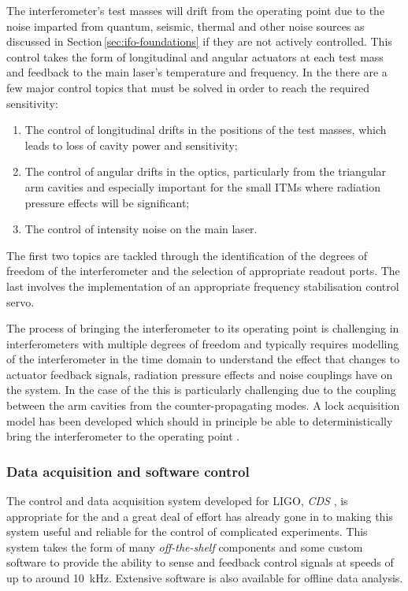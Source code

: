 The interferometer's test masses will drift from the operating point due to the noise imparted from quantum, seismic, thermal and other noise sources as discussed in Section\,\ref{sec:ifo-foundations} if they are not actively controlled. This control takes the form of longitudinal and angular actuators at each test mass and feedback to the main laser's temperature and frequency. In the \SSMEXPT{} there are a few major control topics that must be solved in order to reach the required sensitivity:
\begin{enumerate}
  \item The control of longitudinal drifts in the positions of the test masses, which leads to loss of cavity power and sensitivity;
  \item The control of angular drifts in the optics, particularly from the triangular arm cavities and especially important for the small \glspl{ITM} where radiation pressure effects will be significant;
  \item The control of intensity noise on the main laser.
\end{enumerate}
The first two topics are tackled through the identification of the degrees of freedom of the interferometer and the selection of appropriate readout ports. The last involves the implementation of an appropriate frequency stabilisation control servo.

The process of bringing the interferometer to its operating point is challenging in interferometers with multiple degrees of freedom and typically requires modelling of the interferometer in the time domain to understand the effect that changes to actuator feedback signals, radiation pressure effects and noise couplings have on the system. In the case of the \SSMEXPT{} this is particularly challenging due to the coupling between the arm cavities from the counter-propagating modes. A lock acquisition model has been developed which should in principle be able to deterministically bring the interferometer to the operating point \cite{Glaefke2015}.

\subsubsection{\label{sec:cds}Data acquisition and software control}
The control and data acquisition system developed for \gls{LIGO}, \emph{\gls{CDS}} \cite{Bork2010}, is appropriate for the \SSMEXPT{} and a great deal of effort has already gone in to making this system useful and reliable for the control of complicated experiments. This system takes the form of many \emph{off-the-shelf} components and some custom software to provide the ability to sense and feedback control signals at speeds of up to around \SI{10}{\kilo\hertz}. Extensive software is also available for offline data analysis.

